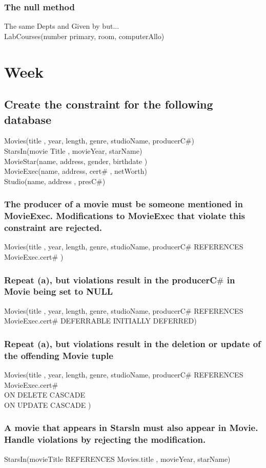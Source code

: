 \documentclass[12pt, a4paper]{article}
\begin{document}
				\subsubsection{The null method}
					The same Depts and Given by but...\\
					LabCourses(number primary, room, computerAllo)
		\section{Week}
			\subsection{Create the constraint for the following database}
				Movies(title , year, length, genre, studioName, producerC$\#$)\\
				StarsIn(movie Title , movieYear, starName)\\
				MovieStar(name, address, gender, birthdate )\\
				MovieExec(name, address, cert$\#$ , netWorth)\\
				Studio(name, address , presC$\#$)
				\subsubsection{The producer of a movie must be someone mentioned in MovieExec. Modifications to MovieExec that violate this constraint are rejected.}
					Movies(title , year, length, genre, studioName, producerC$\#$ REFERENCES MovieExec.cert$\#$ )					
				\subsubsection{Repeat (a), but violations result in the producerC$\#$ in Movie being set to NULL}
					Movies(title , year, length, genre, studioName, producerC$\#$ REFERENCES MovieExec.cert$\#$ DEFERRABLE INITIALLY DEFERRED)									
				\subsubsection{Repeat (a), but violations result in the deletion or update of the offending Movie tuple}
					Movies(title , year, length, genre, studioName, producerC$\#$ REFERENCES MovieExec.cert$\#$\\
						 ON DELETE CASCADE \\
						 ON UPDATE CASCADE  )
				\subsubsection{A movie that appears in Starsln must also appear in Movie. Handle violations by rejecting the modification.}
					StarsIn(movieTitle REFERENCES Movies.title , movieYear, starName)\\		
\end{document}
